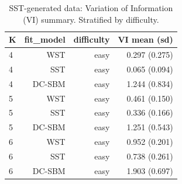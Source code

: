 \begin{table}[!h]
\centering
\caption{SST-generated data: Variation of Information (VI) summary. Stratified by difficulty.\\\label{tab:sst-appx-vi}}
\centering
\begin{tabular}[t]{lrrr}
\toprule
K & fit_model & difficulty & VI mean (sd)\\
\midrule
4 & WST & easy & 0.297 (0.275)\\
4 & SST & easy & 0.065 (0.094)\\
4 & DC-SBM & easy & 1.244 (0.834)\\
5 & WST & easy & 0.461 (0.150)\\
5 & SST & easy & 0.336 (0.166)\\
5 & DC-SBM & easy & 1.251 (0.543)\\
6 & WST & easy & 0.952 (0.201)\\
6 & SST & easy & 0.738 (0.261)\\
6 & DC-SBM & easy & 1.903 (0.697)\\
\bottomrule
\end{tabular}
\end{table}
